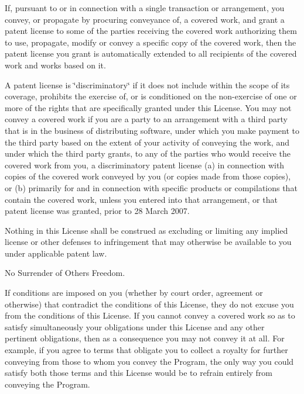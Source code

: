 If, pursuant to or in connection with a single transaction or arrangement, you convey, or propagate by procuring conveyance of, a covered work, and grant a patent license to some of the parties receiving the covered work authorizing them to use, propagate, modify or convey a specific copy of the covered work, then the patent license you grant is automatically extended to all recipients of the covered work and works based on it.

A patent license is \char`\"{}discriminatory\char`\"{} if it does not include within the scope of its coverage, prohibits the exercise of, or is conditioned on the non-\/exercise of one or more of the rights that are specifically granted under this License. You may not convey a covered work if you are a party to an arrangement with a third party that is in the business of distributing software, under which you make payment to the third party based on the extent of your activity of conveying the work, and under which the third party grants, to any of the parties who would receive the covered work from you, a discriminatory patent license (a) in connection with copies of the covered work conveyed by you (or copies made from those copies), or (b) primarily for and in connection with specific products or compilations that contain the covered work, unless you entered into that arrangement, or that patent license was granted, prior to 28 March 2007.

Nothing in this License shall be construed as excluding or limiting any implied license or other defenses to infringement that may otherwise be available to you under applicable patent law.


\begin{DoxyEnumerate}
\item No Surrender of Others\textquotesingle{} Freedom.
\end{DoxyEnumerate}

If conditions are imposed on you (whether by court order, agreement or otherwise) that contradict the conditions of this License, they do not excuse you from the conditions of this License. If you cannot convey a covered work so as to satisfy simultaneously your obligations under this License and any other pertinent obligations, then as a consequence you may not convey it at all. For example, if you agree to terms that obligate you to collect a royalty for further conveying from those to whom you convey the Program, the only way you could satisfy both those terms and this License would be to refrain entirely from conveying the Program.


